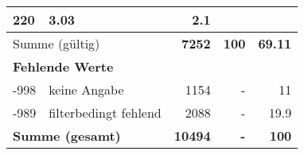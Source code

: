 \begin{longtable}{lXrrr}
       \num{220} &
       \num[round-mode=places,round-precision=2]{3,03} &
         \num[round-mode=places,round-precision=2]{2,1} \\
     \midrule
     \multicolumn{2}{l}{Summe (gültig)} &
       \textbf{\num{7252}} &
     \textbf{100} &
       \textbf{\num[round-mode=places,round-precision=2]{69,11}} \\
     \multicolumn{5}{l}{\textbf{Fehlende Werte}}\\
       -998 &
       keine Angabe &
         \num{1154} &
        - &
         \num[round-mode=places,round-precision=2]{11} \\
       -989 &
       filterbedingt fehlend &
         \num{2088} &
        - &
         \num[round-mode=places,round-precision=2]{19,9} \\
     \midrule
     \multicolumn{2}{l}{\textbf{Summe (gesamt)}} &
          \textbf{\num{10494}} &
        \textbf{-} &
        \textbf{100} \\
     \bottomrule
     \end{longtable}
     
